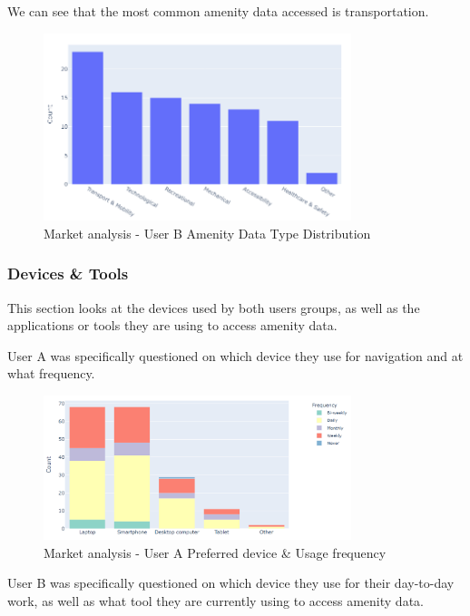 \documentclass[preview]{standalone}
\begin{document}
We can see that the most common amenity data accessed is transportation.

\begin{figure}[htbp]
    \centering{}{}
    \includegraphics[width=0.8\textwidth]{images/mr-userb-amenity.png}
    \caption{Market analysis - User B Amenity Data Type Distribution}
\end{figure}

\subsubsection{Devices \& Tools}
This section looks at the devices used by both users groups, as well as the
applications or tools they are using to access amenity data.

User A was specifically questioned on which device they use for navigation and
at what frequency.

\begin{figure}[htbp]
    \centering{}{}
    \includegraphics[width=0.8\textwidth]{images/mr-usera-device-freq.png}
    \caption{Market analysis - User A Preferred device \& Usage frequency}
\end{figure}

User B was specifically questioned on which device they use for their day-to-day
work, as well as what tool they are currently using to access amenity data.
\end{document}
